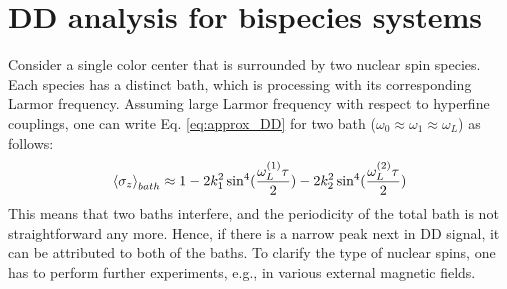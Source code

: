 \documentclass[%
 reprint,
superscriptaddress,
 amsmath,amssymb,
 aps,
]{revtex4-2}
\begin{document}
\section{DD analysis for bispecies systems}
\label{app:bispecies}
Consider a single color center that is surrounded by two nuclear spin species. Each species has a distinct bath, which is processing with its corresponding Larmor frequency. Assuming large Larmor frequency with respect to hyperfine couplings, one can write Eq. \ref{eq:approx_DD} for two bath ($\omega_0 \approx \omega_1 \approx \omega_L$) as follows:
\begin{gather}
	\expval{\sigma_z}_{bath} \approx 1 -2 k_1^2 \sin^4(\frac{\omega_L^{(1)} \tau}{2}) -2 k_2^2 \sin^4(\frac{\omega_L^{(2)} \tau}{2})
\end{gather}
This means that two baths interfere, and the periodicity of the total bath is not straightforward any more. Hence, if there is a narrow peak next in DD signal, it can be attributed to both of the baths. To clarify the type of nuclear spins, one has to perform further experiments, e.g., in various external magnetic fields.


\end{document}
